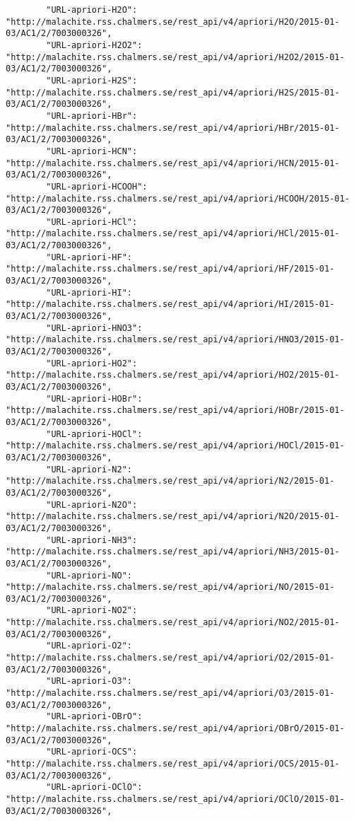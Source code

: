 \begin{enumerate}
\begin{tiny}
\begin{verbatim}
        "URL-apriori-H2O": "http://malachite.rss.chalmers.se/rest_api/v4/apriori/H2O/2015-01-03/AC1/2/7003000326", 
        "URL-apriori-H2O2": "http://malachite.rss.chalmers.se/rest_api/v4/apriori/H2O2/2015-01-03/AC1/2/7003000326", 
        "URL-apriori-H2S": "http://malachite.rss.chalmers.se/rest_api/v4/apriori/H2S/2015-01-03/AC1/2/7003000326", 
        "URL-apriori-HBr": "http://malachite.rss.chalmers.se/rest_api/v4/apriori/HBr/2015-01-03/AC1/2/7003000326", 
        "URL-apriori-HCN": "http://malachite.rss.chalmers.se/rest_api/v4/apriori/HCN/2015-01-03/AC1/2/7003000326", 
        "URL-apriori-HCOOH": "http://malachite.rss.chalmers.se/rest_api/v4/apriori/HCOOH/2015-01-03/AC1/2/7003000326", 
        "URL-apriori-HCl": "http://malachite.rss.chalmers.se/rest_api/v4/apriori/HCl/2015-01-03/AC1/2/7003000326", 
        "URL-apriori-HF": "http://malachite.rss.chalmers.se/rest_api/v4/apriori/HF/2015-01-03/AC1/2/7003000326", 
        "URL-apriori-HI": "http://malachite.rss.chalmers.se/rest_api/v4/apriori/HI/2015-01-03/AC1/2/7003000326", 
        "URL-apriori-HNO3": "http://malachite.rss.chalmers.se/rest_api/v4/apriori/HNO3/2015-01-03/AC1/2/7003000326", 
        "URL-apriori-HO2": "http://malachite.rss.chalmers.se/rest_api/v4/apriori/HO2/2015-01-03/AC1/2/7003000326", 
        "URL-apriori-HOBr": "http://malachite.rss.chalmers.se/rest_api/v4/apriori/HOBr/2015-01-03/AC1/2/7003000326", 
        "URL-apriori-HOCl": "http://malachite.rss.chalmers.se/rest_api/v4/apriori/HOCl/2015-01-03/AC1/2/7003000326", 
        "URL-apriori-N2": "http://malachite.rss.chalmers.se/rest_api/v4/apriori/N2/2015-01-03/AC1/2/7003000326", 
        "URL-apriori-N2O": "http://malachite.rss.chalmers.se/rest_api/v4/apriori/N2O/2015-01-03/AC1/2/7003000326", 
        "URL-apriori-NH3": "http://malachite.rss.chalmers.se/rest_api/v4/apriori/NH3/2015-01-03/AC1/2/7003000326", 
        "URL-apriori-NO": "http://malachite.rss.chalmers.se/rest_api/v4/apriori/NO/2015-01-03/AC1/2/7003000326", 
        "URL-apriori-NO2": "http://malachite.rss.chalmers.se/rest_api/v4/apriori/NO2/2015-01-03/AC1/2/7003000326", 
        "URL-apriori-O2": "http://malachite.rss.chalmers.se/rest_api/v4/apriori/O2/2015-01-03/AC1/2/7003000326", 
        "URL-apriori-O3": "http://malachite.rss.chalmers.se/rest_api/v4/apriori/O3/2015-01-03/AC1/2/7003000326", 
        "URL-apriori-OBrO": "http://malachite.rss.chalmers.se/rest_api/v4/apriori/OBrO/2015-01-03/AC1/2/7003000326", 
        "URL-apriori-OCS": "http://malachite.rss.chalmers.se/rest_api/v4/apriori/OCS/2015-01-03/AC1/2/7003000326", 
        "URL-apriori-OClO": "http://malachite.rss.chalmers.se/rest_api/v4/apriori/OClO/2015-01-03/AC1/2/7003000326", 

\end{verbatim}
\end{tiny}
\end{enumerate}
